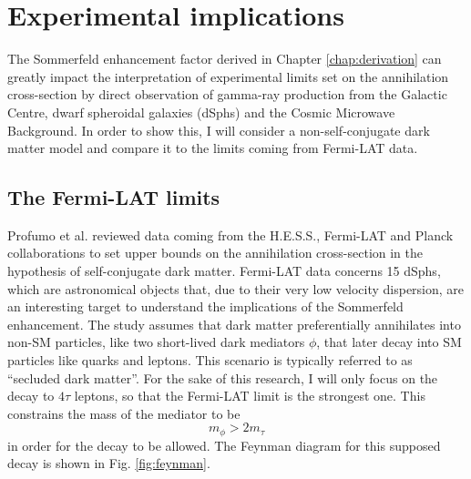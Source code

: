 \chapter{Experimental implications}\label{chap:implications}

The Sommerfeld enhancement factor derived in Chapter \ref{chap:derivation} can greatly impact the interpretation of experimental limits set on the annihilation cross-section by direct observation of gamma-ray production from the Galactic Centre, dwarf spheroidal galaxies (dSphs) and the Cosmic Microwave Background. In order to show this, I will consider a non-self-conjugate dark matter model and compare it to the limits coming from Fermi-LAT data.

\section{The Fermi-LAT limits}

Profumo et al. \cite{Profumo_2018} reviewed data coming from the H.E.S.S., Fermi-LAT and Planck collaborations to set upper bounds on the annihilation cross-section in the hypothesis of self-conjugate dark matter. Fermi-LAT data concerns 15 dSphs, which are astronomical objects that, due to their very low velocity dispersion, are an interesting target to understand the implications of the Sommerfeld enhancement. The study assumes that dark matter preferentially annihilates into non-SM particles, like two short-lived dark mediators \(\phi \), that later decay into SM particles like quarks and leptons. This scenario is typically referred to as ``secluded dark matter''. For the sake of this research, I will only focus on the decay to \(4\tau \) leptons, so that the Fermi-LAT limit is the strongest one. This constrains the mass of the mediator to be
\begin{equation}\label{eq:mediator_mass}
	m_{\phi }  > 2 m_{\tau } 
\end{equation}
in order for the decay to be allowed. The Feynman diagram for this supposed decay is shown in Fig. \ref{fig:feynman}.

